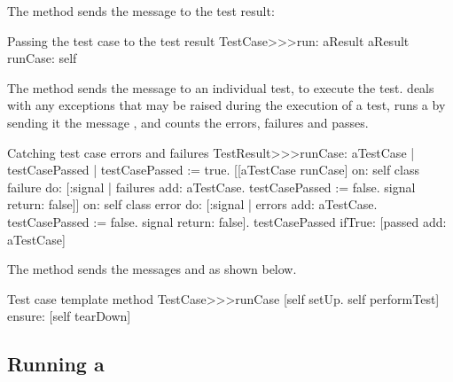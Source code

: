 \documentclass[a4paper,10pt,twoside]{book}
\begin{document}
The method
 sends the message
 to the test result:

\begin{method}[testcaserun:]{Passing the test case to the test result}
TestCase>>>run: aResult
	aResult runCase: self
\end{method}
The method  sends
the message  to an individual test, to execute the test.
 deals with 
any exceptions that may be raised during the
execution of a test, runs a  by sending it the
message , and counts the errors, failures
and passes.
\begin{method}[testresultruncase]{Catching test case errors and failures}
TestResult>>>runCase: aTestCase
	| testCasePassed |
	testCasePassed := true.
	[[aTestCase runCase] 
			on: self class failure
			do: 
				[:signal | 
				failures add: aTestCase.
				testCasePassed := false.
				signal return: false]]
					on: self class error
					do:
						[:signal |
						errors add: aTestCase.
						testCasePassed := false.
						signal return: false].
	testCasePassed ifTrue: [passed add: aTestCase]
\end{method}

The method  sends the messages
 and  as shown below.
\begin{method}[testcaseruncase]{Test case template method}
TestCase>>>runCase
	[self setUp.
	self performTest] ensure: [self tearDown]
\end{method}

\subsection{Running a }
\end{document}
